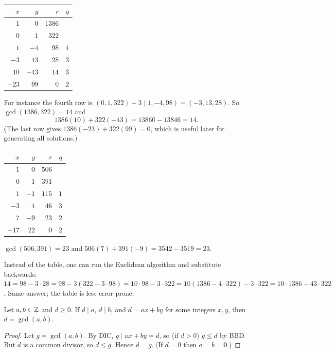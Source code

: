 \begin{example}[EEA for $a = 1386$, $b = 322$]
\begin{center}
\begin{tabular}{rrrr}
\toprule
$x$ & $y$ & $r$ & $q$ \\
\midrule
$1$ & $0$ & $1386$ & \\
$0$ & $1$ & $322$ & \\
$1$ & $-4$ & $98$ & $4$\\
$-3$ & $13$ & $28$ & $3$\\
$10$ & $-43$ & $14$ & $3$\\
$-23$ & $99$ & $0$ & $2$\\
\bottomrule
\end{tabular}
\end{center}
For instance the fourth row is $(0,1,322) - 3(1,-4,98) = (-3, 13, 28)$. So
$\gcd(1386,322) = 14$ and
\[ 1386(10) + 322(-43) = 13860 - 13846 = 14. \]
(The last row gives $1386(-23) + 322(99) = 0$, which is useful later for generating all
solutions.)
\end{example}

\begin{example}[EEA for $a = 506$, $b = 391$]
\begin{center}
\begin{tabular}{rrrr}
\toprule
$x$ & $y$ & $r$ & $q$ \\
\midrule
$1$ & $0$ & $506$ & \\
$0$ & $1$ & $391$ & \\
$1$ & $-1$ & $115$ & $1$\\
$-3$ & $4$ & $46$ & $3$\\
$7$ & $-9$ & $23$ & $2$\\
$-17$ & $22$ & $0$ & $2$\\
\bottomrule
\end{tabular}
\end{center}
$\gcd(506,391) = 23$ and $506(7) + 391(-9) = 3542 - 3519 = 23$.
\end{example}

\begin{important}
Instead of the table, one can run the Euclidean algorithm and substitute backwards:
$14 = 98 - 3\cdot 28 = 98 - 3(322 - 3\cdot 98) = 10\cdot 98 - 3\cdot 322
= 10(1386 - 4\cdot 322) - 3\cdot 322 = 10\cdot 1386 - 43\cdot 322$. Same answer; the table is
less error-prone.
\end{important}

\begin{theorem}
Let $a,b \in \mathbb{Z}$ and $d \geq 0$. If $d \mid a$, $d \mid b$, and $d = ax + by$ for some integers
$x,y$, then $d = \gcd(a,b)$.
\end{theorem}
\begin{proof}
Let $g = \gcd(a,b)$. By DIC, $g \mid ax + by = d$, so (if $d > 0$) $g \le d$ by BBD. But $d$
is a common divisor, so $d \le g$. Hence $d = g$. (If $d = 0$ then $a = b = 0$.)
\end{proof}

